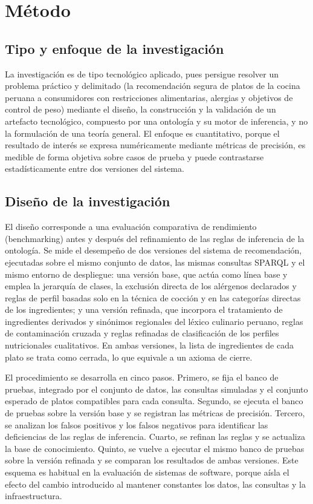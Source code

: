 \documentclass[conference]{IEEEtran}
\begin{document}
\section{Método}

\subsection{Tipo y enfoque de la investigación}
La investigación es de tipo tecnológico aplicado, pues persigue resolver un problema práctico y delimitado (la recomendación segura de platos de la cocina peruana a consumidores con restricciones alimentarias, alergias y objetivos de control de peso) mediante el diseño, la construcción y la validación de un artefacto tecnológico, compuesto por una ontología y su motor de inferencia, y no la formulación de una teoría general. El enfoque es cuantitativo, porque el resultado de interés se expresa numéricamente mediante métricas de precisión, es medible de forma objetiva sobre casos de prueba y puede contrastarse estadísticamente entre dos versiones del sistema.

\subsection{Diseño de la investigación}
El diseño corresponde a una evaluación comparativa de rendimiento (benchmarking) antes y después del refinamiento de las reglas de inferencia de la ontología. Se mide el desempeño de dos versiones del sistema de recomendación, ejecutadas sobre el mismo conjunto de datos, las mismas consultas SPARQL y el mismo entorno de despliegue: una versión base, que actúa como línea base y emplea la jerarquía de clases, la exclusión directa de los alérgenos declarados y reglas de perfil basadas solo en la técnica de cocción y en las categorías directas de los ingredientes; y una versión refinada, que incorpora el tratamiento de ingredientes derivados y sinónimos regionales del léxico culinario peruano, reglas de contaminación cruzada y reglas refinadas de clasificación de los perfiles nutricionales cualitativos. En ambas versiones, la lista de ingredientes de cada plato se trata como cerrada, lo que equivale a un axioma de cierre.

El procedimiento se desarrolla en cinco pasos. Primero, se fija el banco de pruebas, integrado por el conjunto de datos, las consultas simuladas y el conjunto esperado de platos compatibles para cada consulta. Segundo, se ejecuta el banco de pruebas sobre la versión base y se registran las métricas de precisión. Tercero, se analizan los falsos positivos y los falsos negativos para identificar las deficiencias de las reglas de inferencia. Cuarto, se refinan las reglas y se actualiza la base de conocimiento. Quinto, se vuelve a ejecutar el mismo banco de pruebas sobre la versión refinada y se comparan los resultados de ambas versiones. Este esquema es habitual en la evaluación de sistemas de software, porque aísla el efecto del cambio introducido al mantener constantes los datos, las consultas y la infraestructura.
\end{document}
